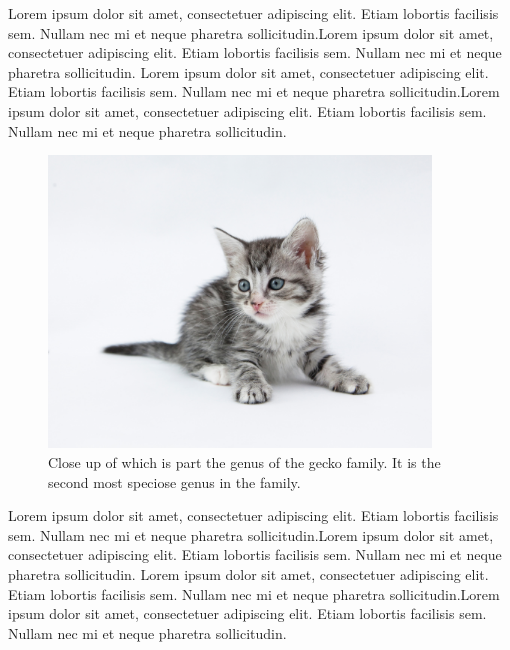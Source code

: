 \documentclass[12pt]{article}
\begin{document}
Lorem ipsum dolor sit amet, consectetuer adipiscing elit. 
Etiam lobortis facilisis sem. Nullam nec mi et neque pharetra sollicitudin.Lorem ipsum dolor sit amet, consectetuer adipiscing elit. Etiam lobortis facilisis sem. Nullam nec mi et neque pharetra sollicitudin. Lorem ipsum dolor sit amet, consectetuer adipiscing elit. 
Etiam lobortis facilisis sem. Nullam nec mi et neque pharetra sollicitudin.Lorem ipsum dolor sit amet, consectetuer adipiscing elit. Etiam lobortis facilisis sem. Nullam nec mi et neque pharetra sollicitudin. 

\begin{figure}
	\centering
	\includegraphics[width=4in]{./kitten2.jpg}
	\caption[Close up of ]
	{Close up of which is part the genus of the gecko family. It is the second most speciose genus in the family.}
	\vspace{40pt}
\end{figure}




\newpage




Lorem ipsum dolor sit amet, consectetuer adipiscing elit. 
Etiam lobortis facilisis sem. Nullam nec mi et neque pharetra sollicitudin.Lorem ipsum dolor sit amet, consectetuer adipiscing elit. Etiam lobortis facilisis sem. Nullam nec mi et neque pharetra sollicitudin. Lorem ipsum dolor sit amet, consectetuer adipiscing elit. 
Etiam lobortis facilisis sem. Nullam nec mi et neque pharetra sollicitudin.Lorem ipsum dolor sit amet, consectetuer adipiscing elit. Etiam lobortis facilisis sem. Nullam nec mi et neque pharetra sollicitudin. 

\vspace{40pt}
\end{document}
